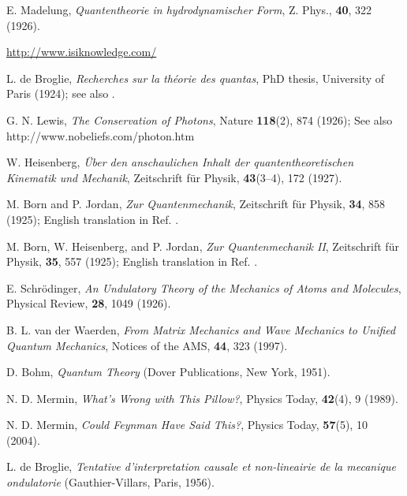 \documentclass[onecolumn,nofootinbib, secnumarabic, amsmath, nobibnotes,12pt,aps,pra]{revtex4-1}
\begin{document}
\begin{thebibliography}{999}
E. Madelung, \emph{Quantentheorie in hydrodynamischer Form}, Z. Phys., \textbf{40},  322 (1926).

\url{http://www.isiknowledge.com/}

L. de Broglie, \emph{Recherches sur la th\'{e}orie des quantas}, PhD
thesis, University of Paris (1924); see also \cite{om.dB_AnnPhys}.

G. N. Lewis, \emph{The Conservation of Photons}, Nature \textbf{118}(2),  874 (1926); See also http://www.nobeliefs.com/photon.htm

W. Heisenberg, \emph{\"{U}ber den anschaulichen Inhalt der quantentheoretischen Kinematik und Mechanik}, Zeitschrift f\"{u}r Physik, \textbf{43}(3--4),  172 (1927).

M. Born and P. Jordan, \emph{Zur Quantenmechanik}, Zeitschrift f\"{u}r Physik, \textbf{34},  858 (1925); English translation in Ref. \cite{om.waerden}.

M. Born, W. Heisenberg, and P. Jordan, \emph{Zur Quantenmechanik II}, Zeitschrift f\"{u}r Physik, \textbf{35},  557 (1925); English translation in Ref. \cite{om.waerden}.

E. Schr\"odinger, \emph{An Undulatory Theory of the Mechanics of Atoms and Molecules}, Physical Review, \textbf{28},  1049 (1926).

B. L. van der Waerden, \emph{From Matrix Mechanics and Wave Mechanics to Unified Quantum Mechanics}, Notices of the AMS, \textbf{44},  323 (1997).

D. Bohm, \emph{Quantum Theory} (Dover Publications, New York, 1951).

N. D. Mermin, \emph{What's Wrong with This Pillow?}, Physics Today, \textbf{42}(4),  9 (1989).

N. D. Mermin, \emph{Could Feynman Have Said This?}, Physics Today, \textbf{57}(5),  10 (2004).

L. de Broglie, \emph{Tentative d'interpretation causale et
non-lineairie de la mecanique ondulatorie} (Gauthier-Villars, Paris,
1956).


\end{thebibliography}
\end{document}
